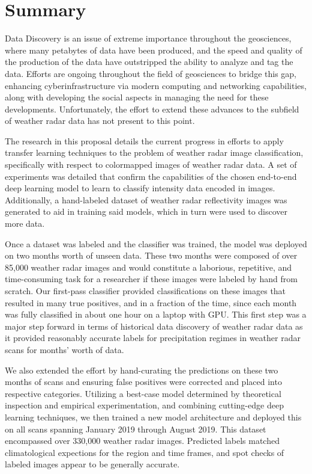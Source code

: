 \chapter{Summary}
\label{sec:summary}

Data Discovery is an issue of extreme importance throughout the geosciences, where many petabytes of data have been produced, and the speed and quality of the production of the data have outstripped the ability to analyze and tag the data.
Efforts are ongoing throughout the field of geosciences to bridge this gap, enhancing cyberinfrastructure via modern computing and networking capabilities, along with developing the social aspects in managing the need for these developments.
Unfortunately, the effort to extend these advances to the subfield of weather radar data has not present to this point.

The research in this proposal details the current progress in efforts to apply transfer learning techniques to the problem of weather radar image classification, specifically with respect to colormapped images of weather radar data.
A set of experiments was detailed that confirm the capabilities of the chosen end-to-end deep learning model to learn to classify intensity data encoded in images.
Additionally, a hand-labeled dataset of weather radar reflectivity images was generated to aid in training said models, which in turn were used to discover more data.

Once a dataset was labeled and the classifier was trained, the model was deployed on two months worth of unseen data.
These two months were composed of over 85,000 weather radar images and would constitute a laborious, repetitive, and time-consuming task for a researcher if these images were labeled by hand from scratch.
Our first-pass classifier provided classifications on these images that resulted in many true positives, and in a fraction of the time, since each month was fully classified in about one hour on a laptop with GPU.
This first step was a major step forward in terms of historical data discovery of weather radar data as it provided reasonably accurate labels for precipitation regimes in weather radar scans for months' worth of data.

We also extended the effort by hand-curating the predictions on these two months of scans and ensuring false positives were corrected and placed into respective categories.
Utilizing a best-case model determined by theoretical inspection and empirical experimentation, and combining cutting-edge deep learning techniques, we then trained a new model architecture and deployed this on all scans spanning January 2019 through August 2019.
This dataset encompassed over 330,000 weather radar images.
Predicted labels matched climatological expections for the region and time frames, and spot checks of labeled images appear to be generally accurate.

